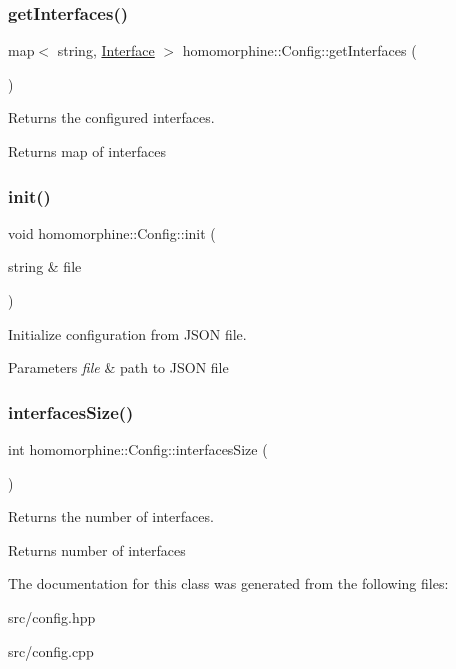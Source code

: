 \subsubsection{\texorpdfstring{getInterfaces()}{getInterfaces()}}
{\footnotesize\ttfamily map$<$ string, \mbox{\hyperlink{classhomomorphine_1_1_interface}{Interface}} $>$ homomorphine\+::\+Config\+::get\+Interfaces (\begin{DoxyParamCaption}{ }\end{DoxyParamCaption})}

Returns the configured interfaces.

\begin{DoxyReturn}{Returns}
map of interfaces 
\end{DoxyReturn}
\mbox{\label{classhomomorphine_1_1_config_ae3df94f615e3bc738525626875715a92}} 
\subsubsection{\texorpdfstring{init()}{init()}}
{\footnotesize\ttfamily void homomorphine\+::\+Config\+::init (\begin{DoxyParamCaption}\item[{string \&}]{file }\end{DoxyParamCaption})}

Initialize configuration from J\+S\+ON file.


\begin{DoxyParams}{Parameters}
{\em file} & path to J\+S\+ON file \\
\hline
\end{DoxyParams}
\mbox{\label{classhomomorphine_1_1_config_a48768be288a3e95be68488c02ce19601}} 
\subsubsection{\texorpdfstring{interfacesSize()}{interfacesSize()}}
{\footnotesize\ttfamily int homomorphine\+::\+Config\+::interfaces\+Size (\begin{DoxyParamCaption}{ }\end{DoxyParamCaption})}

Returns the number of interfaces.

\begin{DoxyReturn}{Returns}
number of interfaces 
\end{DoxyReturn}


The documentation for this class was generated from the following files\+:\begin{DoxyCompactItemize}
\item 
src/config.\+hpp\item 
src/config.\+cpp\end{DoxyCompactItemize}
